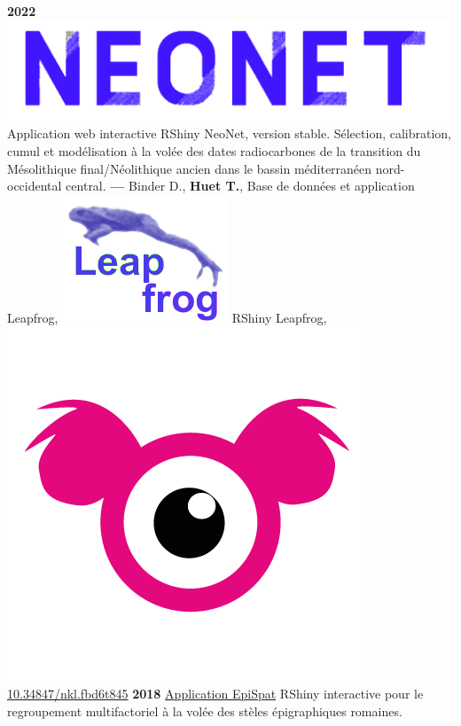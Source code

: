 \documentclass{article}
\begin{document}
\smallbreak
\textbf{2022 }\href{http://shinyserver.cfs.unipi.it:3838/C14/}{\includegraphics[scale=0.03]{neonet-blue.png}} Application web interactive \textsf{RShiny} NeoNet, version stable. Sélection, calibration, cumul et modélisation à la volée des dates radiocarbones de la transition du Mésolithique final/Néolithique ancien dans le bassin méditerranéen nord-occidental central.
\smallbreak
\textbf{--- } Binder D., \textbf{Huet T.}, Base de données et application Leapfrog, \href{https://devr.cepam.cnrs.fr/shinyapps/leap/}{\includegraphics[scale=0.10]{leapfrog-blue.png}} \textsf{RShiny} Leapfrog, \href{https://nakala.fr/10.34847/nkl.fbd6t845}{\includegraphics[scale=0.03]{app-nakala.png} 10.34847/nkl.fbd6t845}
\textbf{2018 }\href{https://epispat.shinyapps.io/analyses_mult_5/}{Application EpiSpat} \textsf{RShiny} interactive pour le regroupement multifactoriel à la volée des stèles épigraphiques romaines.
\smallbreak
\end{document}
